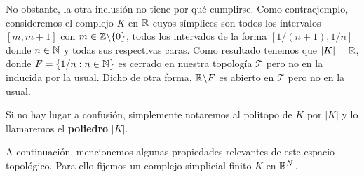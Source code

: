 No obstante, la otra inclusión no tiene por qué cumplirse. Como contraejemplo,
consideremos el complejo $K$ en $\mathbb{R}$ cuyos símplices son todos los intervalos
$[m,m+1]$ con $m \in \mathbb{Z} \backslash \{0\}$, todos los intervalos de la forma $[1/(
n+1), 1/n]$ donde $n \in \mathbb{N}$ y todas sus respectivas caras. Como resultado
tenemos que $|K| = \mathbb{R}$, donde $F = \{1/n : n \in \mathbb{N}\}$ es cerrado en nuestra topología
$\mathcal{T}$ pero no en la inducida por la usual. Dicho de otra forma, $\mathbb{R} \backslash
F$ es abierto en $\mathcal{T}$ pero no en la usual.

Si no hay lugar a confusión, simplemente notaremos al politopo de $K$ por $|K|$
y lo llamaremos el \textbf{poliedro} $|K|$.

A continuación, mencionemos algunas propiedades relevantes de este espacio
topológico. Para ello fijemos un complejo simplicial finito $K$ en $\mathbb{R}^{N}$.

